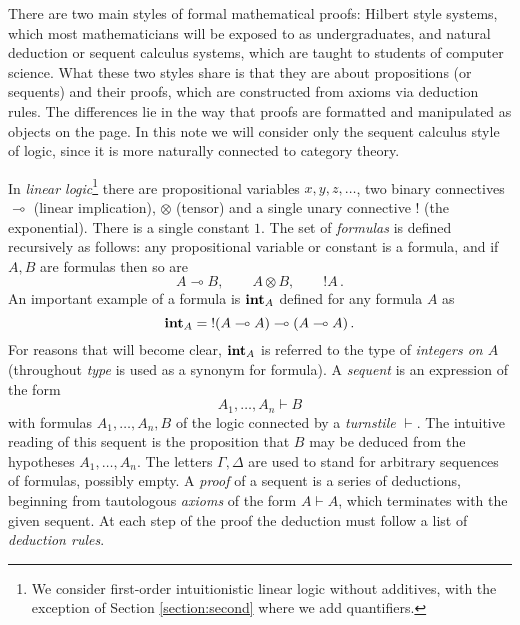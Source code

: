 \documentclass[english,letter paper,12pt,reqno]{article}
\theoremstyle{example}
\numberwithin{equation}{section}
\def\inta{\bold{int}}
\begin{document}

There are two main styles of formal mathematical proofs: Hilbert style systems, which most mathematicians will be exposed to as undergraduates, and natural deduction or sequent calculus systems, which are taught to students of computer science. What these two styles share is that they are about propositions (or sequents) and their proofs, which are constructed from axioms via deduction rules. The differences lie in the way that proofs are formatted and manipulated as objects on the page. In this note we will consider only the sequent calculus style of logic, since it is more naturally connected to category theory.

In \emph{linear logic}\footnote{We consider first-order intuitionistic linear logic without additives, with the exception of Section \ref{section:second} where we add quantifiers.} there are propositional variables $x,y,z,\ldots$, two binary connectives $\multimap$ (linear implication), $\otimes$ (tensor) and a single unary connective $!$ (the exponential). There is a single constant $1$. The set of \emph{formulas} is defined recursively as follows: any propositional variable or constant is a formula, and if $A,B$ are formulas then so are
\[
A \multimap B, \qquad A \otimes B, \qquad {!}A\,.
\]
An important example of a formula is $\inta_A$ defined for any formula $A$ as
\begin{equation}\label{defn:integers} 
\inta_A = {!}( A \multimap A) \multimap (A \multimap A)\,.
\end{equation}
For reasons that will become clear, $\inta_A$ is referred to the type of \emph{integers on $A$} (throughout \emph{type} is used as a synonym for formula). A \emph{sequent} is an expression of the form
\[
A_1,\ldots,A_n \vdash B
\]
with formulas $A_1,\ldots,A_n, B$ of the logic connected by a \emph{turnstile} $\vdash$. The intuitive reading of this sequent is the proposition that $B$ may be deduced from the hypotheses $A_1,\ldots,A_n$. The letters $\Gamma, \Delta$ are used to stand for arbitrary sequences of formulas, possibly empty. A \emph{proof} of a sequent is a series of deductions, beginning from tautologous \emph{axioms} of the form $A \vdash A$, which terminates with the given sequent. At each step of the proof the deduction must follow a list of \emph{deduction rules}. 
\end{document}

